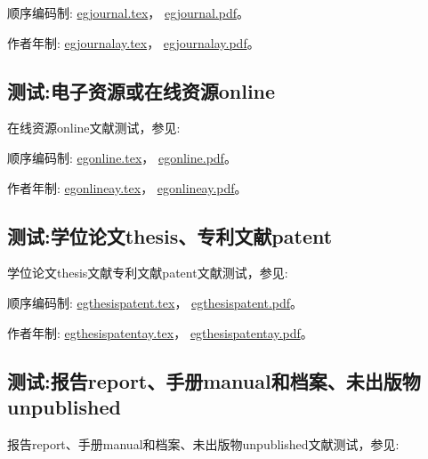 顺序编码制:
\href{run:./example/egjournal.tex}{egjournal.tex}，
\href{run:./example/egjournal.pdf}{egjournal.pdf}。

作者年制:
\href{run:./example/egjournalay.tex}{egjournalay.tex}，
\href{run:./example/egjournalay.pdf}{egjournalay.pdf}。

\subsection{测试:电子资源或在线资源online}
在线资源online文献测试，参见:

顺序编码制:
\href{run:./example/egonline.tex}{egonline.tex}，
\href{run:./example/egonline.pdf}{egonline.pdf}。

作者年制:
\href{run:./example/egonlineay.tex}{egonlineay.tex}，
\href{run:./example/egonlineay.pdf}{egonlineay.pdf}。



\subsection{测试:学位论文thesis、专利文献patent}
学位论文thesis文献专利文献patent文献测试，参见:

顺序编码制:
\href{run:./example/egthesispatent.tex}{egthesispatent.tex}，
\href{run:./example/egthesispatent.pdf}{egthesispatent.pdf}。

作者年制:
\href{run:./example/egthesispatentay.tex}{egthesispatentay.tex}，
\href{run:./example/egthesispatentay.pdf}{egthesispatentay.pdf}。



\subsection{测试:报告report、手册manual和档案、未出版物unpublished}
报告report、手册manual和档案、未出版物unpublished文献测试，参见:

